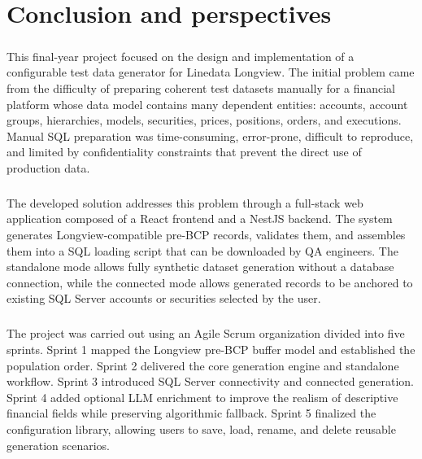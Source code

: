 \chapter*{Conclusion and perspectives}

\paragraph{}This final-year project focused on the design and implementation of a configurable test data
generator for Linedata Longview. The initial problem came from the difficulty of preparing coherent
test datasets manually for a financial platform whose data model contains many dependent entities:
accounts, account groups, hierarchies, models, securities, prices, positions, orders, and
executions. Manual SQL preparation was time-consuming, error-prone, difficult to reproduce, and
limited by confidentiality constraints that prevent the direct use of production data.

\paragraph{}The developed solution addresses this problem through a full-stack web application composed of a
React frontend and a NestJS backend. The system generates Longview-compatible pre-BCP records,
validates them, and assembles them into a SQL loading script that can be downloaded by QA engineers.
The standalone mode allows fully synthetic dataset
generation without a database connection, while the connected mode allows generated records to be
anchored to existing SQL Server accounts or securities selected by the user.

\paragraph{}The project was carried out using an Agile Scrum organization divided into five sprints. Sprint 1
mapped the Longview pre-BCP buffer model and established the population order. Sprint 2 delivered
the core generation engine and standalone workflow. Sprint 3 introduced SQL Server connectivity and
connected generation. Sprint 4 added optional LLM enrichment to improve the realism of descriptive
financial fields while preserving algorithmic fallback. Sprint 5 finalized the configuration
library, allowing users to save, load, rename, and delete reusable generation scenarios.

